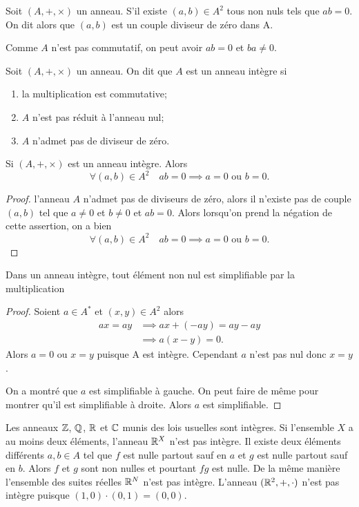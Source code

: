 \begin{defdef}
  Soit $(A,+,\times)$ un anneau. S'il existe $(a,b) \in A^2$ tous non nuls tels que $ab=0$. On dit alors que $(a,b)$ est un couple diviseur de zéro dans A.
\end{defdef}
Comme $A$ n'est pas commutatif, on peut avoir $ab=0$ et $ba \neq 0$.
\begin{defdef}
  Soit $(A,+,\times)$ un anneau. On dit que $A$ est un anneau intègre si
  \begin{enumerate}
  \item la multiplication est commutative;
  \item $A$ n'est pas réduit à l'anneau nul;
  \item $A$ n'admet pas de diviseur de zéro.
  \end{enumerate}
\end{defdef}
\begin{theo}
  Si $(A,+,\times)$ est un anneau intègre. Alors
  \begin{equation}
    \forall (a,b) \in A^2 \quad ab=0 \implies a=0 \text{~ou~} b=0.
  \end{equation}
\end{theo}
\begin{proof}
  l'anneau $A$ n'admet pas de diviseurs de zéro, alors il n'existe pas de couple $(a,b)$ tel que $a \neq 0$ et $b \neq 0$ et $ab=0$. Alors lorsqu'on prend la négation de cette assertion, on a bien
  \begin{equation}
    \forall (a,b) \in A^2 \quad ab=0 \implies a=0 \text{~ou~} b=0.
  \end{equation}
\end{proof}
\begin{theo}
  Dans un anneau intègre, tout élément non nul est simplifiable par la multiplication
\end{theo}
\begin{proof}
  Soient $a \in A^*$ et $(x,y) \in A^2$ alors
  \begin{align}
    ax=ay &\implies ax + (-ay) = ay - ay \\
    &\implies a(x-y)=0.
  \end{align}
Alors $a=0$ ou $x=y$ puisque A est intègre. Cependant $a$ n'est pas nul donc $x=y$.

On a montré que $a$ est simplifiable à gauche. On peut faire de même pour montrer qu'il est simplifiable à droite. Alors $a$ est simplifiable.
\end{proof}

Les anneaux $\mathbb{Z}$, $\mathbb{Q}$, $\mathbb{R}$ et $\mathbb{C}$ munis des lois usuelles sont intègres. Si l'ensemble $X$ a au moins deux éléments, l'anneau $\mathbb{R}^X$ n'est pas intègre. Il existe deux éléments différents $a,b \in A$ tel que $f$ est nulle partout sauf en $a$ et $g$ est nulle partout sauf en $b$. Alors $f$ et $g$ sont non nulles et pourtant $fg$ est nulle. De la même manière l'ensemble des suites réelles $\mathbb{R}^N$ n'est pas intègre. L'anneau $(\mathbb{R}^2,+,\cdot)$ n'est pas intègre puisque $(1,0) \cdot (0,1)=(0,0)$.

